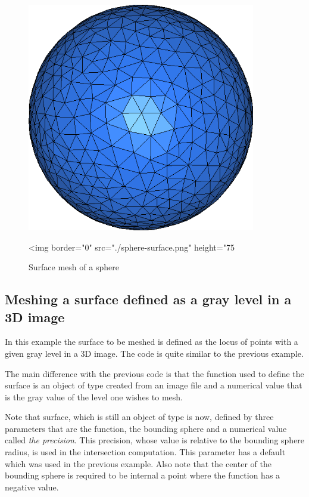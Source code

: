 \begin{figure}[ht]
  \begin{center}
    \begin{ccTexOnly}
      \includegraphics[height=10cm]{Surface_mesher/sphere-surface}
    \end{ccTexOnly}
    \begin{ccHtmlOnly}
      <img border="0" src="./sphere-surface.png" height="75%
    \end{ccHtmlOnly}
  \end{center}
  \caption{Surface mesh of a sphere}
  \label{figure:Surface_mesher-sphere-surface}
\end{figure}


\subsection{Meshing a surface defined as a gray level in a 3D image}
In this example the surface to be meshed is defined
as the locus of points with a given gray level
in a 3D image.
The code is quite similar to the previous example. 

The main difference with the previous code 
is that the function used to define the surface
is  an object of type   created from
an image file and a numerical value that is  the
 gray value of the level one wishes to mesh.

Note that  surface, which is still an object of type  
is now, defined by three parameters that are the function, the bounding
sphere and a numerical value called {\em the precision}. This
precision, whose value
is relative to the bounding sphere radius, is used in the intersection
computation.
This parameter has a default which was used in the previous example.
Also note that the center of the bounding sphere is required to be
internal a point where the function has a negative value.

